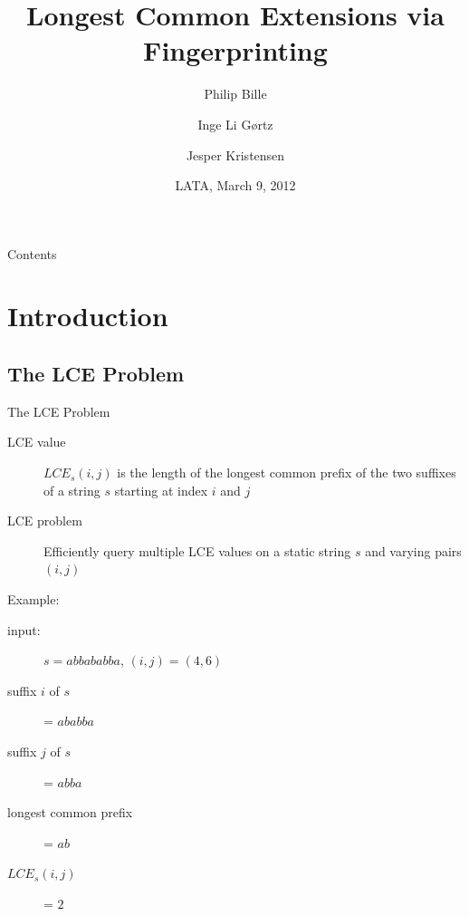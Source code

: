 \documentclass{beamer}
\title{Longest Common Extensions via Fingerprinting}
\author{Philip Bille \and Inge Li G{\o}rtz \and Jesper Kristensen}
\institute[DTU Informatics]{Technical University of Denmark\\DTU Informatics}
\date{LATA, March 9, 2012}
\begin{document}
\newcommand{\sortt}{\textit{sort}(n,\sigma)}
\newcommand{\LCE}{\textit{LCE}}
\newcommand{\NCA}{\textit{NCA}}
\newcommand{\RMQ}{\textit{RMQ}}
\newcommand{\SA}{\textit{SA}}
\newcommand{\SAinv}{\textit{SA}^{-1}} %
\newcommand{\SAi}{SA$^{-1}$} %
\newcommand{\LCP}{\textit{LCP}}
\newcommand{\LA}{\textit{LA}}
\newcommand{\suff}{\textit{suff}}
\newcommand{\logceil}{\lceil\log n\rceil}
\newcommand{\fprint}[1][k]{\ensuremath{\proc{Fingerprint}_{#1}}}
\newcommand{\fprintk}{\fprint[k]}
\newcommand{\RMQpq}[2]{RMQ\textless$#1$, $#2$\textgreater}
\newcommand{\RMQn}{\RMQpq{1}{n}}
\newcommand{\RMQq}{\RMQpq{n}{1}}
\newcommand{\RMQlog}{\RMQpq{n}{\log n}}

\begin{frame}
\titlepage
\end{frame}

\begin{frame}{Contents}
\tableofcontents
\end{frame}

\section{Introduction}

\subsection{The LCE Problem}
\begin{frame}{The LCE Problem}
    \begin{description}
        \item[LCE value] $\LCE_s(i,j)$ is the length of the longest common prefix of the two suffixes of a string $s$ starting at index $i$ and $j$
        \item[LCE problem] Efficiently query multiple LCE values on a static string $s$ and varying pairs $(i,j)$
    \end{description}
    Example:
    \begin{description}
        \item[input:] $s=abbababba$, $(i,j)=(4,6)$
        \item[suffix $i$ of $s$] = $ababba$
        \item[suffix $j$ of $s$] = $abba$
        \item[longest common prefix] = $ab$
        \item[$\LCE_s(i,j)$] = $2$
    \end{description}
\end{frame}
\end{document}
